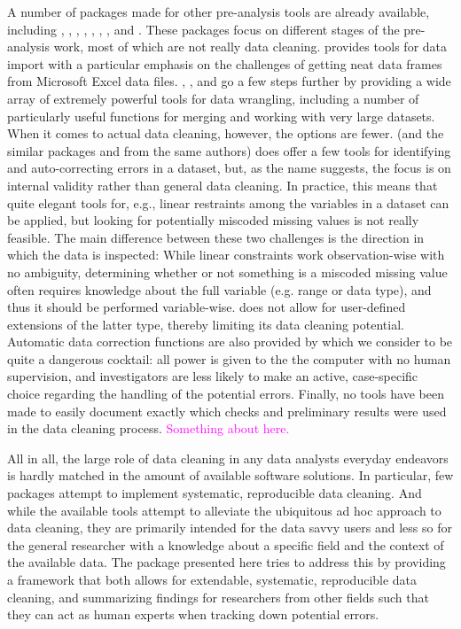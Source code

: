 \documentclass[article,shortnames]{jss}
\newcommand{\hl}[1]{\textcolor{magenta}{#1}}
\begin{document}
A number of  packages made for other pre-analysis tools are
already available, including  \citep{janitor}, 
\citep{dplyr}, \citep{tidyr},  \citep{data.table}, 
\citep{DataCombine} ,  \citep{validate},  \citep{assertr}, and
 \citep{DataExplorer}. These packages focus on
different stages of the pre-analysis work, most of which are not
really data cleaning.   provides tools for data import
with a particular emphasis on the challenges of getting neat data
frames from Microsoft Excel data files. , , 
and  go a few steps further by providing a wide array
of extremely powerful tools for data wrangling, including a number of
particularly useful functions for merging and working with very large
datasets. When it comes to actual data cleaning, however, the options
are fewer.   (and the similar packages 
\citep{editrules} and  \citep{deducorrect} from the
same authors) does offer a few tools for identifying and
auto-correcting errors in a dataset, but, as the name suggests, the
focus is on internal validity rather than general data cleaning. In
practice, this means that quite elegant tools for, e.g., linear
restraints among the variables in a dataset can be applied, but
looking for potentially miscoded missing values is not really
feasible. The main difference between these two challenges is the
direction in which the data is inspected: While linear constraints
work observation-wise with no ambiguity, determining whether or not something
is a miscoded missing value often requires knowledge about the full
variable (e.g. range or data type), and thus it should be performed
variable-wise.  does not allow for user-defined extensions
of the latter type, thereby limiting its data cleaning potential.
Automatic data correction functions are also provided by
 which we consider to be quite a dangerous cocktail: all
power is given to the the computer with no human supervision, and
investigators are less likely to make an active, case-specific choice
regarding the handling of the potential errors.  Finally, no tools
have been made to easily document exactly which checks and preliminary
results were used in the data cleaning process. \hl{Something about  here.}

All in all, the large role of data cleaning in any data analysts
everyday endeavors is hardly matched in the amount of available
 software solutions. In particular, few packages attempt
to implement systematic, reproducible data cleaning. And while the
available tools attempt to alleviate the ubiquitous ad hoc approach to
data cleaning, they are primarily intended for the data savvy users
and less so for the general researcher with a knowledge about a
specific field and the context of the available data. The
 package \citep{dataMaid} presented here tries to address this by
providing a framework that both allows for extendable, systematic,
reproducible data cleaning, and summarizing findings for researchers
from other fields such that they can act as human experts when
tracking down potential errors.
\end{document}
